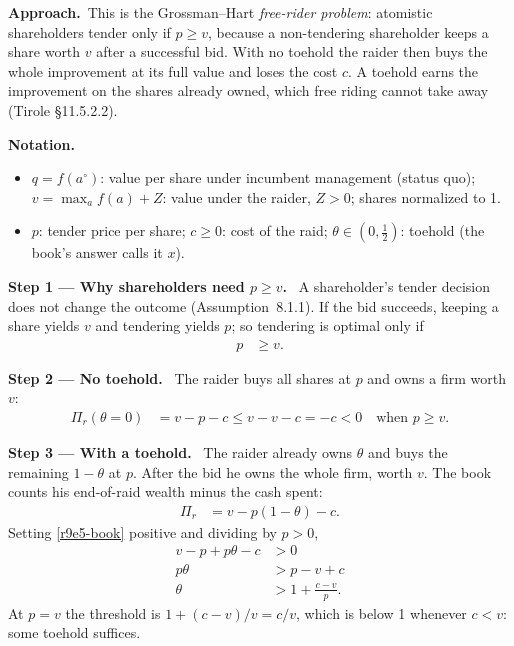 \documentclass[11pt,a4paper]{article}
\newcommand{\notation}{\par\noindent\textbf{Notation.}}
\newcommand{\step}[2]{\par\medskip\noindent\textbf{Step #1 --- #2.}~}
\newcommand{\approach}{\par\smallskip\noindent\textbf{Approach.}~}
\begin{document}
\approach This is the Grossman--Hart \emph{free-rider problem}: atomistic shareholders tender only if
$p\ge v$, because a non-tendering shareholder keeps a share worth $v$ after a successful bid. With no toehold
the raider then buys the whole improvement at its full value and loses the cost $c$. A toehold earns the
improvement on the shares already owned, which free riding cannot take away (Tirole \S11.5.2.2).

\notation
\begin{itemize}
  \item $q=f(a^\circ)$: value per share under incumbent management (status quo); $v=\max_a f(a)+Z$: value under the raider, $Z>0$; shares normalized to 1.
  \item $p$: tender price per share; $c\ge 0$: cost of the raid; $\theta\in(0,\tfrac12)$: toehold (the book's answer calls it $x$).
\end{itemize}

\step{1}{Why shareholders need $p\ge v$} A shareholder's tender decision does not change the outcome
(Assumption~8.1.1). If the bid succeeds, keeping a share yields $v$ and tendering yields $p$; so tendering
is optimal only if
\begin{align}
  p &\ge v. \label{r9e5-fr}
\end{align}

\step{2}{No toehold} The raider buys all shares at $p$ and owns a firm worth $v$:
\begin{align}
  \Pi_r(\theta=0) &= v-p-c \le v-v-c = -c < 0 \quad\text{when } p\ge v. \label{r9e5-no}
\end{align}

\step{3}{With a toehold} The raider already owns $\theta$ and buys the remaining $1-\theta$ at $p$. After the
bid he owns the whole firm, worth $v$. The book counts his end-of-raid wealth minus the cash spent:
\begin{align}
  \Pi_r &= v-p(1-\theta)-c. \label{r9e5-book}
\end{align}
Setting \eqref{r9e5-book} positive and dividing by $p>0$,
\begin{align}
  v-p+p\theta-c &> 0 \nonumber\\
  p\theta &> p-v+c \nonumber\\
  \theta &> 1+\frac{c-v}{p}. \label{r9e5-cond}
\end{align}
At $p=v$ the threshold is $1+(c-v)/v=c/v$, which is below 1 whenever $c<v$: some toehold suffices.
\end{document}
